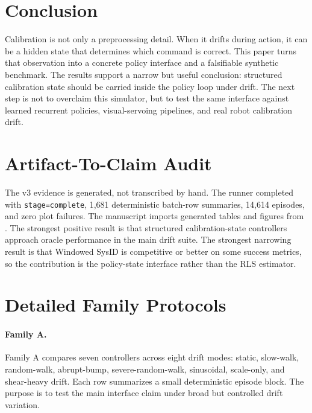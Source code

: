\documentclass{article}
\begin{document}
\section{Conclusion}

Calibration is not only a preprocessing detail. When it drifts during action,
it can be a hidden state that determines which command is correct. This paper
turns that observation into a concrete policy interface and a falsifiable
synthetic benchmark. The results support a narrow but useful conclusion:
structured calibration state should be carried inside the policy loop under
drift. The next step is not to overclaim this simulator, but to test the same
interface against learned recurrent policies, visual-servoing pipelines, and
real robot calibration drift.




\appendix
\renewcommand{\thesection}{\arabic{section}}

\section{Artifact-To-Claim Audit}

The v3 evidence is generated, not transcribed by hand. The runner completed
with \texttt{stage=complete}, 1,681 deterministic batch-row summaries, 14,614
episodes, and zero plot failures. The manuscript imports generated tables and
figures from . The strongest positive result is that
structured calibration-state controllers approach oracle performance in the
main drift suite. The strongest narrowing result is that Windowed SysID is
competitive or better on some success metrics, so the contribution is the
policy-state interface rather than the RLS estimator.

\section{Detailed Family Protocols}

\paragraph{Family A.}
Family A compares seven controllers across eight drift modes: static,
slow-walk, random-walk, abrupt-bump, severe-random-walk, sinusoidal,
scale-only, and shear-heavy drift. Each row summarizes a small deterministic
episode block. The purpose is to test the main interface claim under broad but
controlled drift variation.
\end{document}
